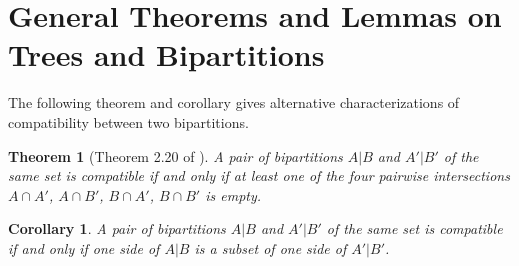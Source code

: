 \documentclass[twocolumn]{bmcart}%
\theoremstyle{mystyle}
\newtheorem{theorem}{Theorem}
\newtheorem{corollary}{Corollary}
\theoremstyle{proofstyle}
\begin{document}
\clearpage
\newpage
\appendix

\section{General Theorems and Lemmas on Trees and Bipartitions}
The following theorem and corollary gives alternative characterizations of compatibility between two bipartitions. 
\begin{theorem}[Theorem 2.20 of \cite{warnow2017computational}]\label{thm:compatibility}
    A pair of bipartitions $A|B$ and $A'|B'$ of the same set is compatible if and only if at least one of the four pairwise intersections $A \cap A'$, $A\cap B'$, $B\cap A'$, $B \cap B'$ is empty. 
\end{theorem}

\begin{corollary}\label{cor:compatibility}
     A pair of bipartitions $A|B$ and $A'|B'$ of the same set is compatible if and only if one side of $A|B$ is a subset of one side of $A'|B'$.
\end{corollary}
\end{document}

